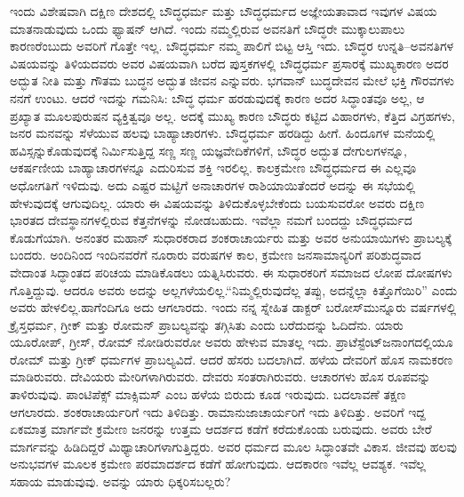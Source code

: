 ಇಂದು ವಿಶೇಷವಾಗಿ ದಕ್ಷಿಣ ದೇಶದಲ್ಲಿ ಬೌದ್ಧಧರ್ಮ ಮತ್ತು ಬೌದ್ಧಧರ್ಮದ ಅಜ್ಞೇಯತಾವಾದ ಇವುಗಳ ವಿಷಯ ಮಾತನಾಡುವುದು ಒಂದು ಫ್ಯಾಷನ್​ ಆಗಿದೆ. ಇಂದು ನಮ್ಮಲ್ಲಿರುವ ಅವನತಿಗೆ ಬೌದ್ಧರೇ ಮುಕ್ಕಾಲುಪಾಲು ಕಾರಣರೆಂಬುದು ಅವರಿಗೆ ಗೊತ್ತೇ ಇಲ್ಲ. ಬೌದ್ಧಧರ್ಮ ನಮ್ಮ ಪಾಲಿಗೆ ಬಿಟ್ಟ ಆಸ್ತಿ ಇದು. ಬೌದ್ಧರ ಉನ್ನತಿ–ಅವನತಿಗಳ ವಿಷಯವನ್ನು ತಿಳಿಯದವರು ಅವರ ವಿಷಯವಾಗಿ ಬರೆದ ಪುಸ್ತಕಗಳಲ್ಲಿ ಬೌದ್ಧಧರ್ಮ ಪ್ರಸಾರಕ್ಕೆ ಮುಖ್ಯಕಾರಣ ಅದರ ಅದ್ಭುತ ನೀತಿ ಮತ್ತು ಗೌತಮ ಬುದ್ಧನ ಅದ್ಭುತ ಜೀವನ ಎನ್ನುವರು. ಭಗವಾನ್​ ಬುದ್ಧದೇವನ ಮೇಲೆ ಭಕ್ತಿ ಗೌರವಗಳು ನನಗೆ ಉಂಟು. ಆದರೆ ಇದನ್ನು ಗಮನಿಸಿ: ಬೌದ್ಧ ಧರ್ಮ ಹರಡುವುದಕ್ಕೆ ಕಾರಣ ಅದರ ಸಿದ್ಧಾಂತವೂ ಅಲ್ಲ, ಆ ಪ್ರಖ್ಯಾತ ಮೂಲಪುರುಷನ ವ್ಯಕ್ತಿತ್ವವೂ ಅಲ್ಲ. ಅದಕ್ಕೆ ಮುಖ್ಯ ಕಾರಣ ಬೌದ್ಧರು ಕಟ್ಟಿದ ವಿಹಾರಗಳು, ಕೆತ್ತಿದ ವಿಗ್ರಹಗಳು, ಜನರ ಮನವನ್ನು ಸೆಳೆಯುವ ಹಲವು ಬಾಹ್ಯಾಚಾರಗಳು. ಬೌದ್ಧಧರ್ಮ ಹರಡಿದ್ದು ಹೀಗೆ. ಹಿಂದೂಗಳ ಮನೆಯಲ್ಲಿ ಹವಿಸ್ಸನ್ನು\break ಕೊಡುವುದಕ್ಕೆ ನಿರ್ಮಿಸುತ್ತಿದ್ದ ಸಣ್ಣ ಸಣ್ಣ ಯಜ್ಞವೇದಿಕೆಗಳಿಗೆ, ಬೌದ್ಧರ ಅದ್ಭುತ ದೇಗುಲಗಳನ್ನೂ, ಆಕರ್ಷಣೀಯ ಬಾಹ್ಯಾಚಾರಗಳನ್ನೂ ಎದುರಿಸುವ ಶಕ್ತಿ ಇರಲಿಲ್ಲ. ಕಾಲಕ್ರಮೇಣ ಬೌದ್ಧಧರ್ಮದ ಈ ಎಲ್ಲವೂ ಅಧೋಗತಿಗೆ ಇಳಿದುವು. ಅದು ಎಷ್ಟರ ಮಟ್ಟಿಗೆ ಅನಾಚಾರಗಳ ರಾಶಿಯಾಯಿತೆಂದರೆ ಅದನ್ನು ಈ ಸಭೆಯಲ್ಲಿ ಹೇಳುವುದಕ್ಕೆ ಆಗುವುದಿಲ್ಲ. ಯಾರು ಈ ವಿಷಯವನ್ನು ತಿಳಿದುಕೊಳ್ಳಬೇಕೆಂದು ಬಯಸುವರೋ ಅವರು ದಕ್ಷಿಣ ಭಾರತದ ದೇವಸ್ಥಾನಗಳಲ್ಲಿರುವ ಕೆತ್ತನೆಗಳನ್ನು ನೋಡಬಹುದು. ಇವೆಲ್ಲಾ ನಮಗೆ ಬಂದದ್ದು ಬೌದ್ಧಧರ್ಮದ ಕೊಡುಗೆಯಾಗಿ. ಅನಂತರ ಮಹಾನ್​ ಸುಧಾರಕರಾದ ಶಂಕರಾಚಾರ್ಯರು ಮತ್ತು ಅವರ ಅನುಯಾಯಿಗಳು ಪ್ರಾಬಲ್ಯಕ್ಕೆ ಬಂದರು. ಅಂದಿನಿಂದ ಇಂದಿನವರೆಗೆ ನೂರಾರು ವರುಷಗಳ ಕಾಲ, ಕ್ರಮೇಣ ಜನಸಾಮಾನ್ಯರಿಗೆ ಪರಿಶುದ್ಧವಾದ ವೇದಾಂತ ಸಿದ್ಧಾಂತದ ಪರಿಚಯ ಮಾಡಿಕೊಡಲು ಯತ್ನಿಸಿರುವರು. ಈ ಸುಧಾರಕರಿಗೆ ಸಮಾಜದ ಲೋಪ ದೋಷಗಳು ಗೊತ್ತಿದ್ದುವು. ಆದರೂ ಅವರು ಅದನ್ನು ಅಲ್ಲಗಳೆಯಲಿಲ್ಲ.\break ``ನಿಮ್ಮಲ್ಲಿರುವುದೆಲ್ಲ ತಪ್ಪು, ಅದನ್ನೆಲ್ಲಾ ಕಿತ್ತೊಗೆಯಿರಿ” ಎಂದು ಅವರು ಹೇಳಲಿಲ್ಲ.\break ಹಾಗೆಂದಿಗೂ ಅದು ಆಗಲಾರದು. ಇಂದು ನನ್ನ ಸ್ನೇಹಿತ ಡಾಕ್ಟರ್​ ಬರೋಸ್​ ಮುನ್ನೂರು ವರ್ಷಗಳಲ್ಲಿ ಕ್ರೈಸ್ತಧರ್ಮ, ಗ್ರೀಕ್​ ಮತ್ತು ರೋಮನ್​ ಪ್ರಾಬಲ್ಯವನ್ನು ತಗ್ಗಿಸಿತು ಎಂದು ಬರೆದುದನ್ನು ಓದಿದೆನು. ಯಾರು ಯೂರೋಪ್​, ಗ್ರೀಸ್​, ರೋಮ್​ ನೋಡಿರುವರೋ ಅವರು ಹೇಳುವ ಮಾತಲ್ಲ ಇದು. ಪ್ರಾಟೆಸ್ಟೆಂಟ್​ ಜನಾಂಗದಲ್ಲಿಯೂ ರೋಮ್​ ಮತ್ತು ಗ್ರೀಕ್​ ಧರ್ಮಗಳ ಪ್ರಾಬಲ್ಯವಿದೆ. ಆದರೆ ಹೆಸರು ಬದಲಾಗಿದೆ. ಹಳೆಯ ದೇವರಿಗೆ ಹೊಸ ನಾಮಕರಣ ಮಾಡಿರುವರು. ದೇವಿಯರು ಮೇರಿಗಳಾಗಿರುವರು. ದೇವರು ಸಂತರಾಗಿರುವರು. ಆಚಾರಗಳು ಹೊಸ ರೂಪವನ್ನು ತಾಳಿರುವುವು. ಪಾಂಟಿಪೆಕ್ಸ್ ಮಾಕ್ಸಿಮಸ್​ ಎಂಬ ಹಳೆಯ ಬಿರುದು ಕೂಡ ಇರುವುದು. ಬದಲಾವಣೆ ತಕ್ಷಣ ಆಗಲಾರದು. ಶಂಕರಾಚಾರ್ಯರಿಗೆ ಇದು ತಿಳಿದಿತ್ತು. ರಾಮಾನುಜಾಚಾರ್ಯರಿಗೆ ಇದು ತಿಳಿದಿತ್ತು. ಅವರಿಗೆ ಇದ್ದ ಏಕಮಾತ್ರ ಮಾರ್ಗವೇ ಕ್ರಮೇಣ ಜನರನ್ನು ಉತ್ತಮ ಆದರ್ಶದ ಕಡೆಗೆ ಕರೆದುಕೊಂಡು ಬರುವುದು. ಅವರು ಬೇರೆ ಮಾರ್ಗವನ್ನು ಹಿಡಿದಿದ್ದರೆ ಮಿಥ್ಯಾಚಾರಿಗಳಾಗುತ್ತಿದ್ದರು. ಅವರ ಧರ್ಮದ ಮೂಲ ಸಿದ್ಧಾಂತವೇ ವಿಕಾಸ. ಜೀವವು ಹಲವು ಅನುಭವಗಳ ಮೂಲಕ ಕ್ರಮೇಣ ಪರಮಾದರ್ಶದ ಕಡೆಗೆ ಹೋಗುವುದು. ಆದಕಾರಣ ಇವೆಲ್ಲ ಆವಶ್ಯಕ. ಇವೆಲ್ಲ ಸಹಾಯ ಮಾಡುವುವು. ಅವನ್ನು ಯಾರು ಧಿಕ್ಕರಿಸಬಲ್ಲರು?

\vskip   4pt

